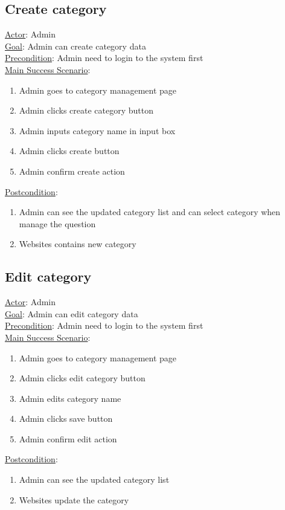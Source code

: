 \documentclass[12pt,oneside,openright,a4paper]{cpe-english-project}
\begin{document}
\subsection{Create category}
\underline{Actor}: Admin\\
\underline{Goal}: Admin can create category data\\
\underline{Precondition}: Admin need to login to the system first\\
\underline{Main Success Scenario}:
\begin{enumerate}[label={\arabic*.}]
	\item Admin goes to category management page
	\item Admin clicks create category button
	\item Admin inputs category name in input box
	\item Admin clicks create button
	\item Admin confirm create action
\end{enumerate}
\underline{Postcondition}: 
\begin{enumerate}[label={\arabic*.}]
	\item Admin can see the updated category list and can select category when manage the question
	\item Websites contains new category
\end{enumerate}

\subsection{Edit category}
\underline{Actor}: Admin\\
\underline{Goal}: Admin can edit category data\\
\underline{Precondition}: Admin need to login to the system first\\
\underline{Main Success Scenario}:
\begin{enumerate}[label={\arabic*.}]
	\item Admin goes to category management page
	\item Admin clicks edit category button
	\item Admin edits category name
	\item Admin clicks save button
	\item Admin confirm edit action
\end{enumerate}
\underline{Postcondition}: 
\begin{enumerate}[label={\arabic*.}]
	\item Admin can see the updated category list
	\item Websites update the category
\end{enumerate}
\end{document}
